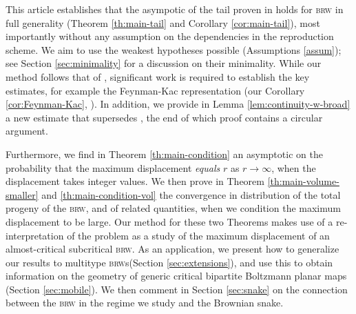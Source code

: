 \documentclass[10pt,a4paper]{article}
\newcommand{\brw}{\textsc{brw}\xspace}
\newcommand{\brws}{\textsc{brw}s\xspace}
\newcommand{\repscheme}{reproduction scheme\xspace}
\begin{document}
This article establishes that the asympotic of the tail proven in \cite[Theorem 1]{lalley2015maximal} holds for \brw in full generality (Theorem \ref{th:main-tail} and Corollary \ref{cor:main-tail}), most importantly without any assumption on the dependencies in the \repscheme. We aim to use the weakest hypotheses possible (Assumptions \ref{assum}); see Section \ref{sec:minimality} for a discussion on their minimality. While our method follows that of \cite{lalley2015maximal}, significant work is required to establish the key estimates, for example the Feynman-Kac representation (our Corollary \ref{cor:Feynman-Kac}, \cite[Corollary 7]{lalley2015maximal}). In addition, we provide in Lemma \ref{lem:continuity-w-broad} a new estimate that supersedes \cite[Lemma 11]{lalley2015maximal}, the end of which proof contains a circular argument. 



Furthermore, we find in Theorem \ref{th:main-condition} an asymptotic on the probability that the maximum displacement \emph{equals} $r$ as $r\to\infty$, when the displacement takes integer values. %
We then prove in Theorem \ref{th:main-volume-smaller} and \ref{th:main-condition-vol} the convergence in distribution of the total progeny of the \brw, and of related quantities, when we condition the maximum displacement to be large. Our method for these two Theorems makes use of a re-interpretation of the problem as a study of the maximum displacement of an almost-critical subcritical \brw. %
As an application, we present how to generalize our results to multitype \brws (Section \ref{sec:extensions}), and use this to obtain information on the geometry of generic critical bipartite Boltzmann planar maps (Section \ref{sec:mobile}). We then comment in Section \ref{sec:snake} on the connection between the \brw in the regime we study and the Brownian snake. 
\end{document}
